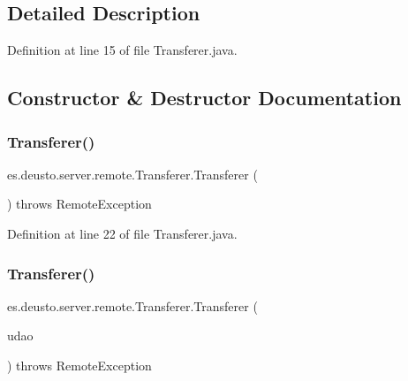 \subsection{Detailed Description}


Definition at line 15 of file Transferer.\+java.



\subsection{Constructor \& Destructor Documentation}
\mbox{\label{classes_1_1deusto_1_1server_1_1remote_1_1_transferer_ad9465ee99430add24c3bf6badab21a91}} 
\subsubsection{\texorpdfstring{Transferer()}{Transferer()}\hspace{0.1cm}{\footnotesize\ttfamily [1/2]}}
{\footnotesize\ttfamily es.\+deusto.\+server.\+remote.\+Transferer.\+Transferer (\begin{DoxyParamCaption}{ }\end{DoxyParamCaption}) throws Remote\+Exception}



Definition at line 22 of file Transferer.\+java.

\mbox{\label{classes_1_1deusto_1_1server_1_1remote_1_1_transferer_a1cd1f321e0f5650f8a37907e8cb23840}} 
\subsubsection{\texorpdfstring{Transferer()}{Transferer()}\hspace{0.1cm}{\footnotesize\ttfamily [2/2]}}
{\footnotesize\ttfamily es.\+deusto.\+server.\+remote.\+Transferer.\+Transferer (\begin{DoxyParamCaption}\item[{\hyperlink{interfacees_1_1deusto_1_1server_1_1db_1_1dao_1_1_i_d_a_o}{I\+D\+AO}}]{udao }\end{DoxyParamCaption}) throws Remote\+Exception}




